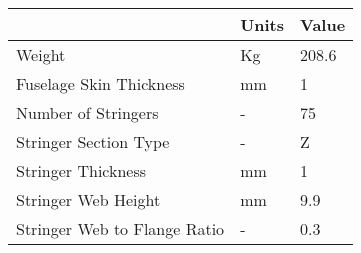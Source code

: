 \begin{tabular}{lll}
& Units & Value \\ 
\hline 
Weight & Kg & 208.6 \\ 
Fuselage Skin Thickness & mm & 1 \\ 
Number of Stringers & - & 75 \\ 
Stringer Section Type & - & Z \\ 
Stringer Thickness & mm & 1 \\ 
Stringer Web Height & mm & 9.9 \\ 
Stringer Web to Flange Ratio & - & 0.3 \\ 
\hline 
\end{tabular}